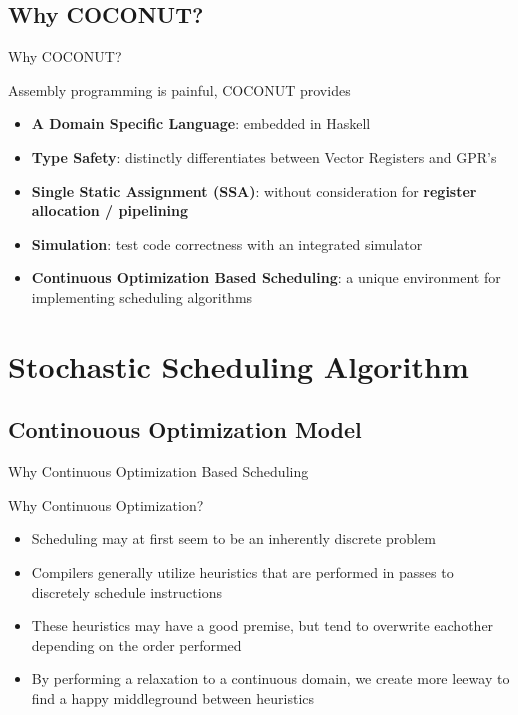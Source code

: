 \documentclass{beamer}
\begin{document}
\begin{darkframes}
\subsection{Why COCONUT?}
\begin{frame}{Why COCONUT?}
    
  Assembly programming is painful, COCONUT provides
    \qquad \\
    \begin{itemize}
            \item {\bf \color{green}A Domain Specific Language}: embedded in Haskell
            \item {\bf \color{green} Type Safety}: distinctly differentiates between Vector
              Registers and GPR's
            \item {\bf \color{green} Single Static Assignment (SSA)}: without consideration for {\bf register allocation / pipelining}
            \item {\bf \color{green} Simulation}: test code correctness with an
              integrated simulator
            \item {\bf \color{green}Continuous Optimization Based Scheduling}: a unique environment for
              implementing scheduling algorithms
        \end{itemize}    
\end{frame}

\section{Stochastic Scheduling Algorithm}

\subsection{Continouous Optimization Model}

\begin{frame}{Why Continuous Optimization Based Scheduling}

  Why Continuous Optimization?
  \begin{itemize}
  \item Scheduling may at first seem to be an inherently \alert{discrete} problem
  \item Compilers generally utilize \alert{heuristics} that are
    \alert{performed in passes} to discretely schedule instructions
  \item These heuristics may have a good premise, but tend to \alert{overwrite eachother} depending on the order performed
  \item By performing a \alert{relaxation to a continuous domain}, we
    create more leeway to find a happy middleground between heuristics
  \end{itemize}
\end{frame}


\end{darkframes}
\end{document}
